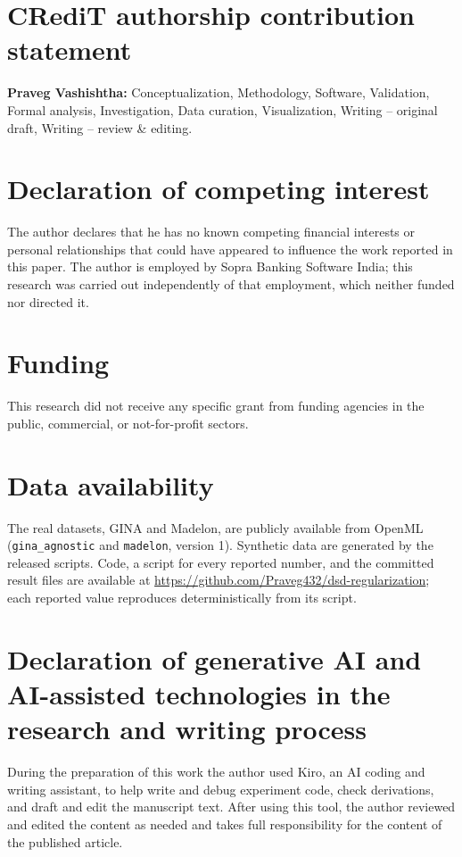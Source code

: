 \documentclass[preprint,12pt]{elsarticle}
\begin{document}
\section*{CRediT authorship contribution statement}
\textbf{Praveg Vashishtha:} Conceptualization, Methodology, Software, Validation, Formal analysis,
Investigation, Data curation, Visualization, Writing -- original draft, Writing -- review \& editing.

\section*{Declaration of competing interest}
The author declares that he has no known competing financial interests or personal relationships that
could have appeared to influence the work reported in this paper. The author is employed by Sopra
Banking Software India; this research was carried out independently of that employment, which neither
funded nor directed it.

\section*{Funding}
This research did not receive any specific grant from funding agencies in the public, commercial, or
not-for-profit sectors.

\section*{Data availability}
The real datasets, GINA and Madelon, are publicly available from OpenML (\texttt{gina\_agnostic} and
\texttt{madelon}, version 1). Synthetic data are generated by the released scripts. Code, a script for
every reported number, and the committed result files are available at
\url{https://github.com/Praveg432/dsd-regularization}; each reported value reproduces
deterministically from its script.

\section*{Declaration of generative AI and AI-assisted technologies in the research and writing process}
During the preparation of this work the author used Kiro, an AI coding and writing assistant, to help
write and debug experiment code, check derivations, and draft and edit the manuscript text. After using
this tool, the author reviewed and edited the content as needed and takes full responsibility for the
content of the published article.



\end{document}
